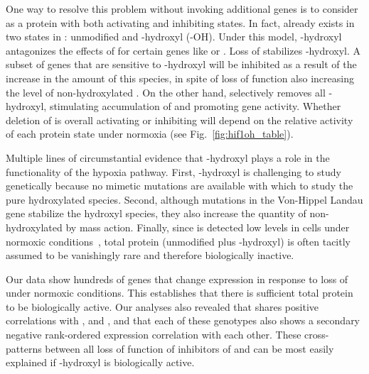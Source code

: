 One way to resolve this problem without invoking additional genes is to
consider \hifp{} as a protein with both activating and inhibiting states. In fact,
\hifp{} already exists in two states in \cel{}: unmodified \hifp{} and
\hifp{}-hydroxyl (\hifp{}-OH). Under this model, \hifp{}-hydroxyl antagonizes
the effects of \hifp{} for certain genes like \ftna{} or \nlp{}. Loss of
 stabilizes \hifp{}-hydroxyl.
A subset of genes that are sensitive to \hifp{}-hydroxyl will be inhibited as a
result of the increase in the amount of this species, in spite of loss of
 function also increasing the level of non-hydroxylated \hifp{}.
On the other hand, \egl{} selectively removes all \hifp{}-hydroxyl, stimulating
accumulation of \hifp{} and promoting gene activity. Whether deletion of \hif{}
is overall activating or inhibiting will depend on the relative activity of each
protein state under normoxia (see Fig.~\ref{fig:hif1oh_table}).

Multiple lines of circumstantial evidence that \hifp{}-hydroxyl plays a role
in the functionality of the hypoxia pathway. First, \hifp{}-hydroxyl is
challenging to study genetically because no mimetic mutations are available with
which to study the pure hydroxylated \hifp{} species. Second, although mutations in
the Von-Hippel Landau gene stabilize the hydroxyl species, they also increase the
quantity of non-hydroxylated \hifp{} by mass action.
Finally, since \hifp{} is detected low levels
in cells under normoxic conditions~\citep{Wang1993}, total \hifp{} protein
(unmodified \hifp{} plus \hifp{}-hydroxyl) is often tacitly assumed to be
vanishingly rare and therefore biologically inactive.

Our data show hundreds of genes that change expression in response
to loss of  under normoxic conditions. This establishes that there is
sufficient total \hifp{} protein to be biologically active.
Our analyses also revealed that \hif{} shares
positive correlations with \egl{}, \rhy{} and \vhl{}, and that each of these genotypes
also shows a secondary negative rank-ordered expression correlation with each other.
These cross-patterns between all loss of function of inhibitors of \hifp{} and
\hif{} can be most easily explained if \hifp{}-hydroxyl is biologically active.

